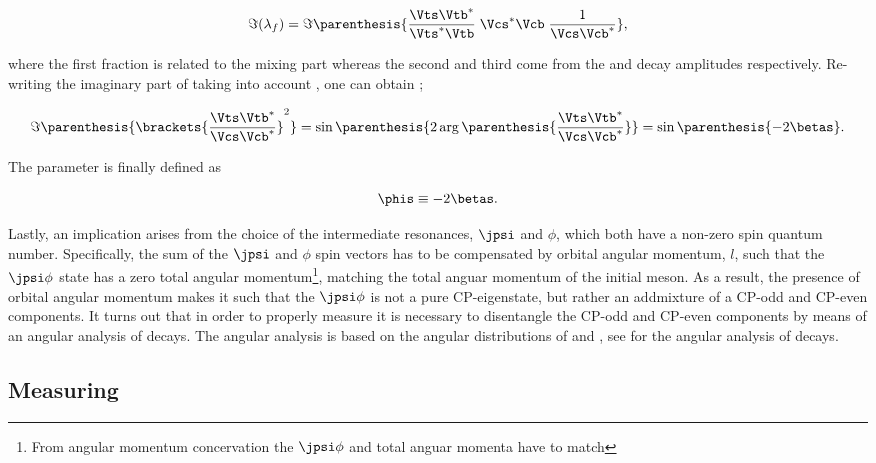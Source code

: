 \begin{equation}
  \centering
 \Im(\lambda_f) = \Im\parenthesis{ \frac{\Vts\Vtb^*}{\Vts^*\Vtb} \; \Vcs^*\Vcb \; \frac{1}{\Vcs\Vcb^*} },
 \label{lambdaf_ckm}
\end{equation}

\noindent where the first fraction is related to the mixing part \qoverp whereas the second and third come from the \Bsb and \Bs
decay amplitudes respectively. Re-writing the imaginary part of  taking into account ,
one can obtain ;

\begin{equation}
  \centering
  \Im\parenthesis{ \brackets{ \frac{\Vts\Vtb^*}{\Vcs\Vcb^*}}^2 } =
  \sin \parenthesis{2 \arg \parenthesis{\frac{\Vts\Vtb^*}{\Vcs\Vcb^*}}} =
  \sin \parenthesis{-2\betas}.
 \label{lambda_ckm_manip}
\end{equation}

\noindent The parameter \phis is finally defined as

\begin{equation}
  \centering
  \phis\equiv-2\betas.
 \label{phis_def}
\end{equation}

\noindent Lastly, an implication arises from the choice of the intermediate resonances, $\jpsi$ and $\phi$,
which both have a non-zero spin quantum number. Specifically, the sum of the $\jpsi$ and $\phi$ spin vectors
has to be compensated by orbital angular momentum, $l$, such that the $\jpsi\phi$ state has a zero total angular momentum\footnote{
From angular momentum concervation the $\jpsi\phi$ and \Bs total anguar momenta have to match}, matching the
total anguar momentum of the initial \Bs meson. As a result, the presence of orbital angular momentum makes
it such that the $\jpsi\phi$ is not a pure CP-eigenstate, but rather an addmixture of a CP-odd and CP-even components.
It turns out that in order to properly measure \phis it is necessary to disentangle the CP-odd and CP-even
components by means of an angular analysis of \BsJpsiPhi decays. The angular analysis is based on the
angular distributions of \phiKK and \Jpsimumu, see  for the angular analysis
of \BsJpsiKst decays.

\subsection{Measuring \phis}
\label{measuring_phis}

